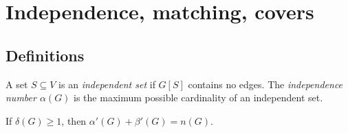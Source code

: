 \section{Independence, matching, covers}

\subsection{Definitions}


\begin{definition}
    A set $S \subseteq V$ is an \emph{independent set} if $G[S]$ contains no edges.
    The \emph{independence number $\alpha(G)$} is the maximum possible cardinality of an independent set.
\end{definition}

\begin{definition}

\end{definition}

\begin{definition}

\end{definition}

\begin{definition}

\end{definition}

\begin{theorem}[Gallai]
    If $\delta(G) \ge 1$, then $\alpha'(G) + \beta'(G) = n(G)$.
\end{theorem}

